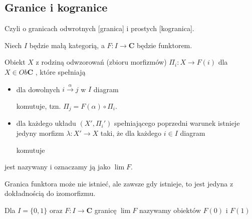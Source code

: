 \subsection{Granice i kogranice}

Czyli o granicach odwrotnych [granica] i prostych [kogranica].

Niech $I$ będzie małą kategorią, a $F:I\to\mathbf{C}$ będzie funktorem.

\begin{definition}
  Obiekt $X$ z rodziną odwzorowań (zbioru morfizmów) $\Pi_i:X\to F(i)$ dla $X\in Ob\mathbf{C}$ , które spełniają
  \begin{itemize}
    \item \acc{[zgodność]} dla dowolnych $i\xrightarrow{\alpha}j$ w $I$ diagram
      \begin{center}\end{center}
      komutuje, tzn. $\Pi_j=F(\alpha)\circ\Pi_i$.
    \item \acc{[uniwersalność]} dla każdego układu $(X',\Pi_i')$ spełniającego poprzedni warunek istnieje jedyny morfizm $\lambda:X'\to X$ taki, że dla każdego $i\in I$ diagram
      \begin{center}\end{center}
    komutuje
  \end{itemize}
  jest nazywany  i oznaczamy ją jako $\lim F$.
\end{definition}

Granica funktora może nie istnieć, ale zawsze gdy istnieje, to jest jedyna z dokładnością do izomorfizmu.

\begin{example}
  \item Dla $I=\{0,1\}$ oraz $F:I\to \mathbf{C}$ granicę $\lim F$ nazywamy  obiektów $F(0)$ i $F(1)$
    \begin{center}\end{center}
\end{example}

\begin{definition} 
\end{definition}
